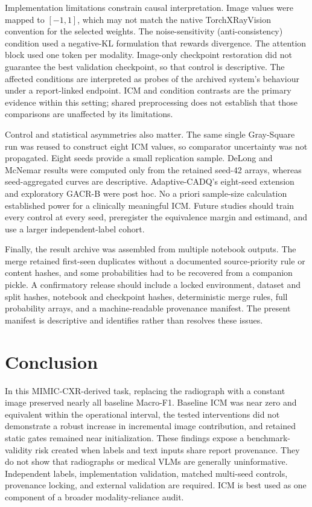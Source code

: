\documentclass[a4paper,fleqn]{cas-sc}
\begin{document}
Implementation limitations constrain causal interpretation. Image values were
mapped to $[-1,1]$, which may not match the native TorchXRayVision convention
for the selected weights. The noise-sensitivity (anti-consistency) condition
used a negative-KL formulation that rewards divergence. The attention block
used one token per modality. Image-only checkpoint restoration did not
guarantee the best validation checkpoint, so that control is descriptive.
The affected conditions are interpreted as probes of the archived system's
behaviour under a report-linked endpoint. ICM and condition contrasts are the
primary evidence within this setting; shared preprocessing does not establish
that those comparisons are unaffected by its limitations.

Control and statistical asymmetries also matter. The same single Gray-Square
run was reused to construct eight ICM values, so comparator uncertainty was not
propagated. Eight seeds provide a small replication sample. DeLong and McNemar
results were computed only from the retained seed-42 arrays, whereas
seed-aggregated curves are descriptive. Adaptive-CADQ's eight-seed extension and
exploratory GACR-B were post hoc. No a priori sample-size calculation established power for
a clinically meaningful ICM. Future studies should train every control at every
seed, preregister the equivalence margin and estimand, and use a larger
independent-label cohort.

Finally, the result archive was assembled from multiple notebook outputs. The
merge retained first-seen duplicates without a documented source-priority rule
or content hashes, and some probabilities had to be recovered from a companion
pickle. A confirmatory release should include a locked environment, dataset and
split hashes, notebook and checkpoint hashes, deterministic merge rules, full
probability arrays, and a machine-readable provenance manifest. The present
manifest is descriptive and identifies rather than resolves these issues.

\section{Conclusion}\label{sec:conclusion}

In this MIMIC-CXR-derived task, replacing the radiograph with a constant image
preserved nearly all baseline Macro-F1. Baseline ICM was near zero and equivalent
within the operational interval, the tested interventions did not demonstrate a
robust increase in incremental image contribution, and retained static gates
remained near initialization. These findings expose a benchmark-validity risk
created when labels and text inputs share report provenance. They do not show
that radiographs or medical VLMs are generally uninformative. Independent
labels, implementation validation, matched multi-seed controls, provenance
locking, and external validation are required. ICM is best used as one component
of a broader modality-reliance audit.
\end{document}
